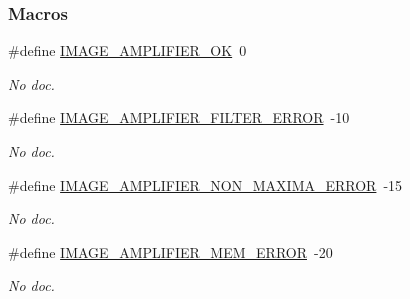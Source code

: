 \subsubsection*{Macros}
\begin{DoxyCompactItemize}
\item 
\hypertarget{a00011_ad4757f615c82fc0c11ca12509addda11}{\#define \hyperlink{a00011_ad4757f615c82fc0c11ca12509addda11}{I\-M\-A\-G\-E\-\_\-\-A\-M\-P\-L\-I\-F\-I\-E\-R\-\_\-\-O\-K}~0}\label{a00011_ad4757f615c82fc0c11ca12509addda11}

\begin{DoxyCompactList}\small\item\em No doc. \end{DoxyCompactList}\item 
\hypertarget{a00011_ae436e4b7fc21db27f5839e1ff2f11ad0}{\#define \hyperlink{a00011_ae436e4b7fc21db27f5839e1ff2f11ad0}{I\-M\-A\-G\-E\-\_\-\-A\-M\-P\-L\-I\-F\-I\-E\-R\-\_\-\-F\-I\-L\-T\-E\-R\-\_\-\-E\-R\-R\-O\-R}~-\/10}\label{a00011_ae436e4b7fc21db27f5839e1ff2f11ad0}

\begin{DoxyCompactList}\small\item\em No doc. \end{DoxyCompactList}\item 
\hypertarget{a00011_afe85512071c88f9b99781422844e8fb4}{\#define \hyperlink{a00011_afe85512071c88f9b99781422844e8fb4}{I\-M\-A\-G\-E\-\_\-\-A\-M\-P\-L\-I\-F\-I\-E\-R\-\_\-\-N\-O\-N\-\_\-\-M\-A\-X\-I\-M\-A\-\_\-\-E\-R\-R\-O\-R}~-\/15}\label{a00011_afe85512071c88f9b99781422844e8fb4}

\begin{DoxyCompactList}\small\item\em No doc. \end{DoxyCompactList}\item 
\hypertarget{a00011_a6923f44a0c9d6c9677800a23c957bfa8}{\#define \hyperlink{a00011_a6923f44a0c9d6c9677800a23c957bfa8}{I\-M\-A\-G\-E\-\_\-\-A\-M\-P\-L\-I\-F\-I\-E\-R\-\_\-\-M\-E\-M\-\_\-\-E\-R\-R\-O\-R}~-\/20}\label{a00011_a6923f44a0c9d6c9677800a23c957bfa8}

\begin{DoxyCompactList}\small\item\em No doc. \end{DoxyCompactList}\end{DoxyCompactItemize}
